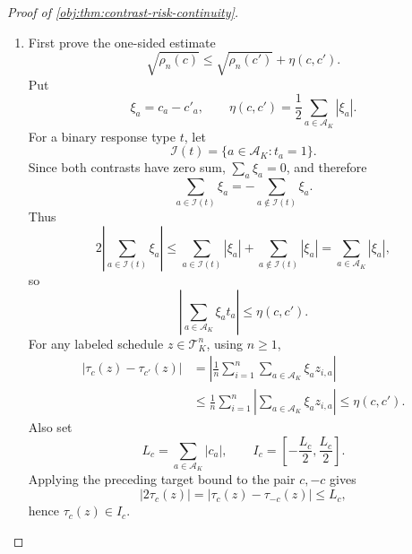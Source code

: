 \documentclass[11pt]{article}
\begin{document}
\begin{proof}[Proof of \cref{obj:thm:contrast-risk-continuity}]
\begin{enumerate}
\item First prove the one-sided estimate
\[
\sqrt{\rho_n(c)}\le \sqrt{\rho_n(c')}+\eta(c,c').
\]
Put
\[
\xi_a=c_a-c'_a,\qquad
\eta(c,c')=\frac12\sum_{a\in\mathcal A_K}|\xi_a|.
\]
For a binary response type \(t\), let
\[
\mathcal I(t)=\{a\in\mathcal A_K:t_a=1\}.
\]
Since both contrasts have zero sum, \(\sum_a \xi_a=0\), and therefore
\[
\sum_{a\in\mathcal I(t)}\xi_a
=
-\sum_{a\notin\mathcal I(t)}\xi_a .
\]
Thus
\[
2\left|\sum_{a\in\mathcal I(t)}\xi_a\right|
\le
\sum_{a\in\mathcal I(t)}|\xi_a|
+
\sum_{a\notin\mathcal I(t)}|\xi_a|
=
\sum_{a\in\mathcal A_K}|\xi_a|,
\]
so
\[
\left|\sum_{a\in\mathcal A_K}\xi_a t_a\right|
\le \eta(c,c').
\]
For any labeled schedule \(z\in\mathcal T_K^n\), using \(n\ge1\),
\[
\begin{aligned}
|\tau_c(z)-\tau_{c'}(z)|
&=
\left|\frac1n\sum_{i=1}^n\sum_{a\in\mathcal A_K}\xi_a z_{i,a}\right|  \\
&\le
\frac1n\sum_{i=1}^n
\left|\sum_{a\in\mathcal A_K}\xi_a z_{i,a}\right|
\le
\eta(c,c').
\end{aligned}
\]
Also set
\[
L_c=\sum_{a\in\mathcal A_K}|c_a|,
\qquad
I_c=\left[-\frac{L_c}{2},\frac{L_c}{2}\right].
\]
Applying the preceding target bound to the pair \(c,-c\) gives
\[
|2\tau_c(z)|=|\tau_c(z)-\tau_{-c}(z)|\le L_c,
\]
hence \(\tau_c(z)\in I_c\).


\end{enumerate}
\end{proof}
\end{document}

